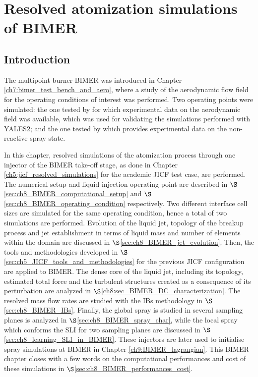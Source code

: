 \chapter{Resolved atomization simulations of BIMER}
\label{ch8:bimer_resolved_atomization}


\section{Introduction}

The multipoint burner BIMER was introduced in Chapter \ref{ch7:bimer_test_bench_and_aero}, where a study of the aerodynamic flow field for the operating conditions of interest was performed. Two operating points were simulated: the one tested by  for which experimental data on the aerodynamic field was available, which was used for validating the simulations performed with YALES2; and the one tested by  which provides experimental data on the non-reactive spray state. 

In this chapter, resolved simulations of the atomization process through one injector of the BIMER take-off stage, as done in Chapter \ref{ch5:jicf_resolved_simulations} for the academic JICF test case, are performed. The numerical setup and liquid injection operating point are described in $\S$\ref{sec:ch8_BIMER_computational_setup} and $\S$\ref{sec:ch8_BIMER_operating_condition} respectively. Two different interface cell sizes are simulated for the same operating condition, hence a total of two simulations are performed. Evolution of the liquid jet, topology of the breakup process and jet establishment in terms of liquid mass and number of elements within the domain are discussed in $\S$\ref{sec:ch8_BIMER_jet_evolution}. Then, the tools and methodologies developed in $\S$\ref{sec:ch5_JICF_tools_and_methodologies} for the previous JICF configuration are applied to BIMER. The dense core of the liquid jet, including its topology, estimated total force and the turbulent structures created as a consequence of its perturbation are analyzed in $\S$\ref{ch8:sec_BIMER_DC_characterization}. The resolved mass flow rates are studied with the IBs methodology in $\S$\ref{sec:ch8_BIMER_IBs}. Finally, the global spray is studied in several sampling planes is analyzed in $\S$\ref{sec:ch8_BIMER_spray_char}, while the local spray which conforms the SLI for two sampling planes are discussed in $\S$\ref{sec:ch8_learning_SLI_in_BIMER}. These injectors are later used to initialise spray simulations at BIMER in Chapter \ref{ch9:BIMER_lagrangian}. This BIMER chapter closes with a few words on the computational performances and cost of these simulations in $\S$\ref{sec:ch8_BIMER_performances_cost}.



